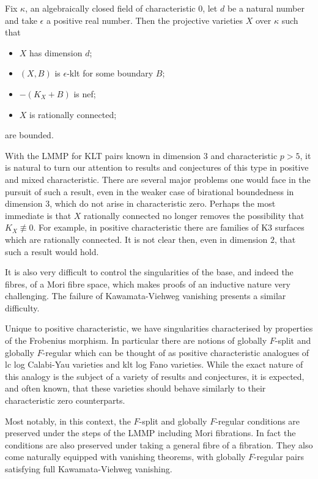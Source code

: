 	\begin{conjecture}
		Fix $\kappa$, an algebraically closed field of characteristic $0$, let $d$ be a natural number and take $\epsilon$ a positive real number. Then the projective varieties $X$ over $\kappa$ such that 
		\begin{itemize}
			\item $X$ has dimension $d$;
			\item $(X,B)$ is $\epsilon$-klt for some boundary $B$;
			\item $-(K_{X}+B)$ is nef;
			\item $X$ is rationally connected;
		\end{itemize}
		are bounded.	
	\end{conjecture}

	With the LMMP for KLT pairs known in dimension $3$ and characteristic $p>5$, it is natural to turn our attention to results and conjectures of this type in positive and mixed characteristic. There are several major problems one would face in the pursuit of such a result, even in the weaker case of birational boundedness in dimension $3$, which do not arise in characteristic zero. Perhaps the most immediate is that $X$ rationally connected no longer removes the possibility that $K_{X} \not\equiv 0$. For example, in positive characteristic there are families of K3 surfaces which are rationally connected. It is not clear then, even in dimension $2$, that such a result would hold.
	
	It is also very difficult to control the singularities of the base, and indeed the fibres, of a Mori fibre space, which makes proofs of an inductive nature very challenging. The failure of Kawamata-Viehweg vanishing presents a similar difficulty.
	
	Unique to positive characteristic, we have singularities characterised by properties of the Frobenius morphism. In particular there are notions of globally $F$-split and globally $F$-regular which can be thought of as positive characteristic analogues of lc log Calabi-Yau varieties and klt log Fano varieties. While the exact nature of this analogy is the subject of a variety of results and conjectures, it is expected, and often known, that these varieties should behave similarly to their characteristic zero counterparts.
	
	Most notably, in this context, the $F$-split and globally $F$-regular conditions are preserved under the steps of the LMMP including Mori fibrations. In fact the conditions are also preserved under taking a general fibre of a fibration. They also come naturally equipped with vanishing theorems, with globally $F$-regular pairs satisfying full Kawamata-Viehweg vanishing. 
	
